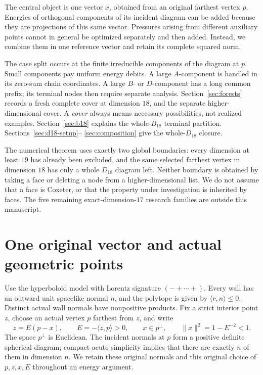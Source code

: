 \documentclass[11pt]{article}
\theoremstyle{definition}
\theoremstyle{remark}
\newcommand{\ip}[2]{\langle #1,#2\rangle}
\newcommand{\norm}[1]{\lVert #1\rVert}
\begin{document}
The central object is one vector \(x\), obtained from an original
farthest vertex \(p\). Energies of orthogonal components of its incident
diagram can be added because they are projections of this same vector.
Pressures arising from different auxiliary points cannot in general
be optimized separately and then added. Instead, we combine them in
one reference vector and retain its complete squared norm.

The case split occurs at the finite irreducible components of the
diagram at \(p\). Small components pay uniform energy debits.
A large \(A\)-component is handled in its zero-sum chain coordinates.
A large \(B\)- or \(D\)-component has a long common prefix; its terminal
nodes then require separate analysis. Section~\ref{sec:forests} records a
fresh complete cover at dimension \(18\), and the separate
higher-dimensional cover. A \emph{cover} always means necessary
possibilities, not realized examples. Section~\ref{sec:b18} explains the
whole-\(B_{18}\) terminal partition. Sections~\ref{sec:d18-setup}--%
\ref{sec:composition} give the whole-\(D_{18}\) closure.

The numerical theorem uses exactly two global boundaries:
every dimension at least \(19\) has already been excluded, and the
same selected farthest vertex in dimension \(18\) has only a whole
\(D_{18}\) diagram left. Neither boundary is obtained by taking a face
or deleting a node from a higher-dimensional list. We do not assume
that a face is Coxeter, or that the property under investigation is
inherited by faces. The five remaining exact-dimension-\(17\) research
families are outside this manuscript.

\section{One original vector and actual geometric points}
\label{sec:geometry}
Use the hyperboloid model with Lorentz signature \((-+\cdots+)\).
Every wall has an outward unit spacelike normal \(n\), and the polytope
is given by \(\ip{r}{n}\leq0\). Distinct actual wall normals have
nonpositive products. Fix a strict interior point \(z\), choose an
actual vertex \(p\) farthest from \(z\), and write
\begin{equation}
\label{eq:original}
 z=E(p-x),\qquad E=-\ip{z}{p}>0,\qquad
 x\in p^\perp,\qquad \norm{x}^{2}=1-E^{-2}<1.
\end{equation}
The space \(p^\perp\) is Euclidean. The incident normals at \(p\) form
a positive definite spherical diagram; compact acute simplicity
implies that there are exactly \(n\) of them in dimension \(n\).
We retain these original normals and this original choice of
\(p,z,x,E\) throughout an energy argument.
\end{document}
